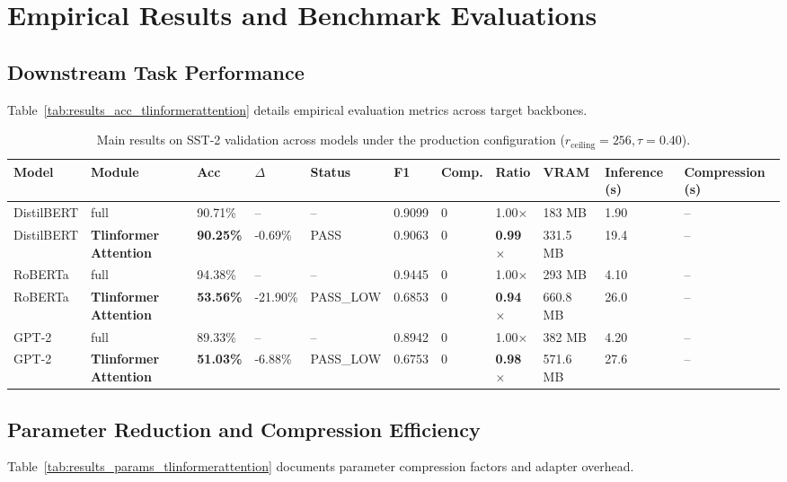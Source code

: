 \section{Empirical Results and Benchmark Evaluations}

\subsection{Downstream Task Performance}
Table~\ref{tab:results_acc_tlinformerattention} details empirical evaluation metrics across target backbones.

\begin{table}[t]
\centering
\small
\begin{tabular}{lllllllllll}
\toprule
\textbf{Model} & \textbf{Module} & \textbf{Acc} & \textbf{$\Delta$} & \textbf{Status} & \textbf{F1} & \textbf{Comp.} & \textbf{Ratio} & \textbf{VRAM} & \textbf{Inference (s)} & \textbf{Compression (s)} \\
\midrule
DistilBERT & full & 90.71\% & -- & -- & 0.9099 & 0 & 1.00$\times$ & 183 MB & 1.90 & -- \\
DistilBERT & \textbf{Tlinformer Attention} & \textbf{90.25\%} & -0.69\% & PASS & 0.9063 & 0 & \textbf{0.99$\times$} & 331.5 MB & 19.4 & -- \\
RoBERTa & full & 94.38\% & -- & -- & 0.9445 & 0 & 1.00$\times$ & 293 MB & 4.10 & -- \\
RoBERTa & \textbf{Tlinformer Attention} & \textbf{53.56\%} & -21.90\% & PASS_LOW & 0.6853 & 0 & \textbf{0.94$\times$} & 660.8 MB & 26.0 & -- \\
GPT-2 & full & 89.33\% & -- & -- & 0.8942 & 0 & 1.00$\times$ & 382 MB & 4.20 & -- \\
GPT-2 & \textbf{Tlinformer Attention} & \textbf{51.03\%} & -6.88\% & PASS_LOW & 0.6753 & 0 & \textbf{0.98$\times$} & 571.6 MB & 27.6 & -- \\
\bottomrule
\end{tabular}
\caption{Main results on SST-2 validation across models under the production configuration ($r_{\mathrm{ceiling}}=256, \tau=0.40$).}
\label{tab:main_sst2}
\end{table}

\subsection{Parameter Reduction and Compression Efficiency}
Table~\ref{tab:results_params_tlinformerattention} documents parameter compression factors and adapter overhead.

